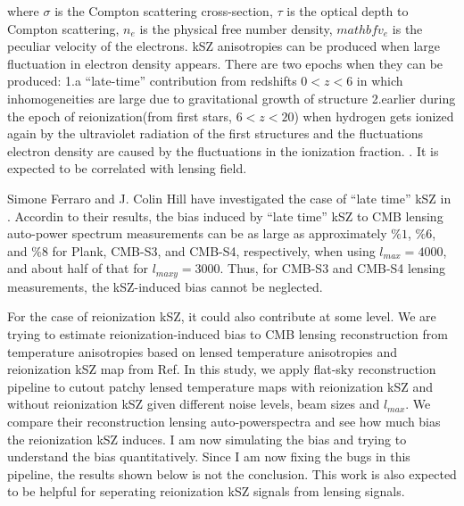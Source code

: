 \documentclass[12pt, notitlepage, onecolumn, amsmath, amssymb, aps]{revtex4-1}
\begin{document}
where \(\sigma\) is the Compton scattering cross-section, \(\tau\) is the optical depth to Compton scattering, \(n_{e}\) is the physical free number density, \(mathbf{v}_{e}\) is the peculiar velocity of the electrons.
kSZ anisotropies can be produced when large fluctuation in electron density appears. There are two epochs when they can be produced: 1.a ``late-time'' contribution from redshifts \(0<z<6\) in which inhomogeneities are large due to gravitational growth of structure 2.earlier during the epoch of reionization(from first stars, \(6<z<20\)) when hydrogen gets ionized again by the ultraviolet radiation of the first structures and the fluctuations electron density are caused by the fluctuations in the ionization fraction.\cite{Ferraro:2017fac} \cite{Alvarez:2015xzu}. It is expected to be correlated with lensing field.

Simone Ferraro and J. Colin Hill  have investigated the case of ``late time'' kSZ in \cite{Ferraro:2017fac}. Accordin to their results, the bias induced by ``late time'' kSZ to CMB lensing auto-power spectrum measurements can be as large as approximately \(\%1\), \(\%6\), and \(\%8\) for Plank, CMB-S3, and CMB-S4, respectively, when using \(l_{max} = 4000\), and about half of that for \(l_{maxy} = 3000\). Thus, for CMB-S3 and CMB-S4 lensing measurements, the kSZ-induced bias cannot be neglected.

For the case of reionization kSZ, it could also contribute at some level. We are trying to estimate reionization-induced bias to CMB lensing reconstruction from temperature anisotropies based on lensed temperature anisotropies\cite{Stein:2020its} and reionization kSZ map from Ref\cite{Alvarez:2015xzu}. In this study, we apply flat-sky reconstruction pipeline to cutout patchy lensed temperature maps with reionization kSZ and without reionization kSZ given different noise levels, beam sizes and \(l_{max}\). We compare their reconstruction lensing auto-powerspectra and see how much bias the reionization kSZ induces.
I am now simulating the bias and trying to understand the bias quantitatively. Since I am now fixing the bugs in this pipeline, the results shown below is not the conclusion. This work is also expected to be helpful for seperating reionization kSZ signals from lensing signals.




\end{document}
